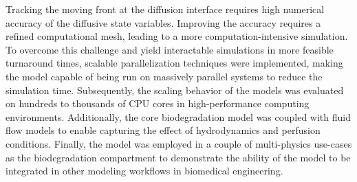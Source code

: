 Tracking the moving front at the diffusion interface requires high numerical accuracy of the diffusive state variables. Improving the accuracy requires a refined computational mesh, leading to a more computation-intensive simulation. To overcome this challenge and yield interactable simulations in more feasible turnaround times, scalable parallelization techniques were implemented, making the model capable of being run on massively parallel systems to reduce the simulation time. Subsequently, the scaling behavior of the models was evaluated on hundreds to thousands of CPU cores in high-performance computing environments. Additionally, the core biodegradation model was coupled with fluid flow models to enable capturing the effect of hydrodynamics and perfusion conditions. Finally, the model was employed in a couple of multi-physics use-cases as the biodegradation compartment to demonstrate the ability of the model to be integrated in other modeling workflows in biomedical engineering.

\cleardoublepage

